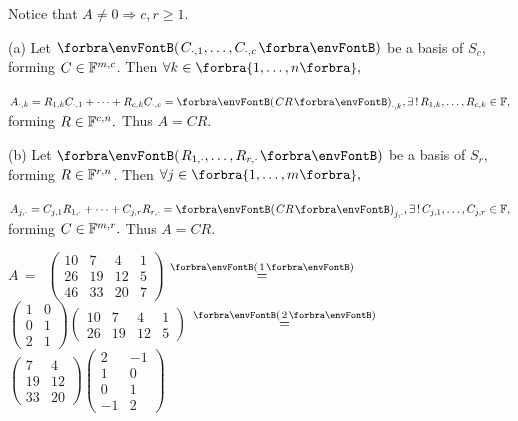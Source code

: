 Notice that $A\neq 0\Rightarrow c,r\geqslant 1.$\vspace{2pt}\par\quad
(a) Let $\Par{C_{\cdot,1},\dots,C_{\cdot,c}}$ be a basis of $S_c$, forming $C\in{\mathbb{F}}^{m,c}$. Then $\forall k\in\Bra{1,\dots,n},$\vspace{2pt}\par\quad\Ha
$A_{\cdot,k}=R_{1,k}C_{\cdot,1}+\dots+R_{c,k}C_{\cdot,c}=\Par{CR}_{\cdot,k},\exists\,!\,R_{1,k},\dots,R_{c,k}\in\Fbb,$ forming $R\in{\mathbb{F}}^{c,n}.$ Thus $A=CR.$\vspace{4pt}\par\quad
(b) Let $\Par{R_{1,\cdot},\dots,R_{r,\cdot}}$ be a basis of $S_r,$ forming $R\in{\mathbb{F}}^{r,n}$. Then $\forall j\in\Bra{1,\dots,m},$\vspace{2pt}\par\quad\Hb
$A_{j,\cdot}=C_{j,1}R_{1,\cdot}+\dots+C_{j,r}R_{r,\cdot}=\Par{CR}_{j,\cdot},\exists\,!\,C_{j,1},\dots,C_{j,r}\in\Fbb,$ forming $C\in{\mathbb{F}}^{m,r}.$ Thus $A=CR.$\PfEnd\vspace{4pt}
\Example\par\quad
$A\,=\,$ {\normalsize$\begin{pmatrix} 10 & 7 & 4 & 1 \\ 26 & 19 & 12 & 5\\ 46 & 33 & 20 & 7\end{pmatrix}$
{$\overset{\Par{1}}{=}$}
$\begin{pmatrix} 1 & 0\\ 0 & 1\\ 2 & 1\end{pmatrix}\begin{pmatrix} 10 & 7 & 4 & 1\\ 26 & 19 & 12 & 5\end{pmatrix}$
{$\overset{\Par{2}}{=}$}
$\begin{pmatrix} 7 & 4\\ 19 & 12\\ 33 & 20\end{pmatrix}\begin{pmatrix} 2 & -1\\ 1 & 0\\ 0 & 1\\ -1 & 2\end{pmatrix}$}\par\quad
